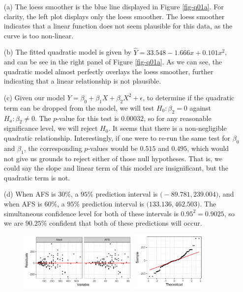 \documentclass[10pt]{article}
\begin{document}
\begin{itemize}
    \item[(a)] The loess smoother is the blue line displayed in Figure \ref{fig-q01a}. For clarity, the left plot displays only the loess smoother. The loess 
    smoother indicates that a linear function does not seem plausible for this data, as the curve is too non-linear. 
    \item[(b)] The fitted quadratic model is given by \(\hat{Y} = 33.548 - 1.666 x + 0.101 x^2\), and can be see in the right panel of Figure \ref{fig-q01a}. 
    As we can see, the quadratic model almost perfectly overlays the loess smoother, further indicating that a linear relationship is not plausible. 
    \item[(c)] Given our model \(Y = \beta_0 + \beta_1 X + \beta_2 X^2 + \epsilon\), to determine if the quadratic term can be dropped from the model, we will
    test \(H_0 : \beta_2 = 0\) against \(H_a : \beta_2 \neq 0\). The \(p\)-value for this test is \(0.00032\), so for any reasonable significance level, we
    will reject \(H_0\). It seems that there is a non-negligible quadratic relationship. Interestingly, if one were to re-run the same test for \(\beta_0\) and 
    \(\beta_1\), the corresponding \(p\)-values would be \(0.515\) and \(0.495\), which would not give us grounds to reject either of those null hypotheses.
    That is, we could say the slope and linear term of this model are insignificant, but the quadratic term is not. 
    \item[(d)] When AFS is \(30\%{}\), a \(95\%{}\) prediction interval is \(\big( -89.781, 239.004 \big)\), and when AFS is \(60\%{}\), a \(95\%{}\) prediction 
    interval is \(\big( 133.136, 462.503 \big)\). The simultaneous confidence level for both of these intervals is \(0.95^2 = 0.9025\), so we are \(90.25\%{}\) 
    confident that both of these predictions will occur. 
    \begin{figure}[ht]
        \centering
        \includegraphics[width = 0.55\textwidth]{img/q01-residuals.png}
        \includegraphics[width = 0.35\textwidth]{img/q01-qqplot.png}

\end{figure}
\end{itemize}
\end{document}
